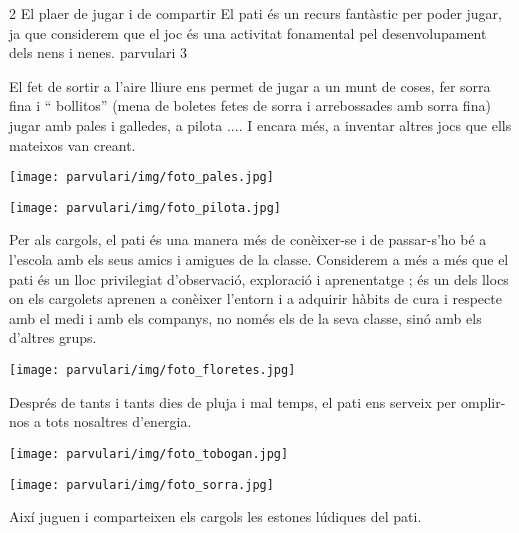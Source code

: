 \begin{news}
{2} %
{El plaer de jugar i de compartir}
{El pati és un recurs fantàstic  per poder jugar, ja que considerem que el joc és una activitat fonamental pel desenvolupament dels nens i nenes.
}
{parvulari}
{3} %


El fet de sortir a l’aire lliure ens permet de jugar a un munt de coses, fer sorra fina i “ bollitos” (mena de boletes fetes de sorra i arrebossades amb sorra fina) jugar amb pales i galledes, a pilota .... I encara més,  a inventar altres jocs que ells mateixos van  creant.


\noindent\texttt{[image: parvulari/img/foto\_pales.jpg]}


\noindent\texttt{[image: parvulari/img/foto\_pilota.jpg]}

Per als cargols, el pati és una manera més de conèixer-se i de passar-s’ho bé a l’escola amb els seus amics i amigues de la classe.
Considerem a més a més que el pati és un lloc privilegiat d’observació, exploració i aprenentatge ; és un dels llocs on els cargolets aprenen a conèixer l’entorn i a adquirir hàbits de cura  i respecte amb el medi i amb els companys, no només els de la seva classe,  sinó amb els d’altres grups.


\noindent\texttt{[image: parvulari/img/foto\_floretes.jpg]}

Després de tants i tants dies de pluja i mal temps, el pati ens serveix per omplir-nos a tots nosaltres d’energia. 

\noindent\texttt{[image: parvulari/img/foto\_tobogan.jpg]}

\noindent\texttt{[image: parvulari/img/foto\_sorra.jpg]}


Així juguen i comparteixen els cargols les estones lúdiques del pati.



\end{news}
